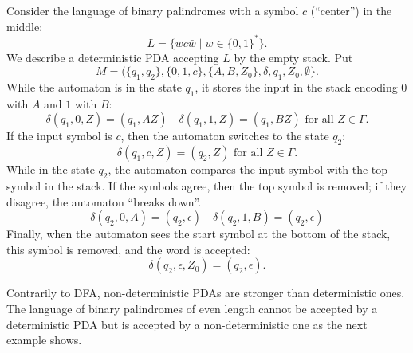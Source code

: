 \begin{page}
\setcounter{section}{6}
\setcounter{subsection}{1}
\setcounter{dfn}{4}
\label{portion:1257}

\begin{exl}
Consider the language of binary palindromes with a symbol $c$ (``center'') in the middle:
\[
L = \{w c \bar{w} \mid w \in \{0,1\}^*\}.
\]
We describe a deterministic PDA accepting $L$ by the empty stack. Put
\[
M = (\{q_1, q_2\}, \{0, 1, c\}, \{A, B, Z_0\}, \delta, q_1, Z_0, \emptyset\}.
\]
While the automaton is in the state $q_1$, it stores the input in the stack encoding $0$ with $A$ and $1$ with $B$:
\[
\delta(q_1, 0, Z) = (q_1, AZ) \quad \delta(q_1, 1, Z) = (q_1, BZ) \text{ for all }Z \in \Gamma.
\]
If the input symbol is $c$, then the automaton switches to the state $q_2$:
\[
\delta(q_1, c, Z) = (q_2, Z) \text{ for all }Z \in \Gamma.
\]
While in the state $q_2$, the automaton compares the input symbol with the top symbol in the stack.
If the symbols agree, then the top symbol is removed; if they disagree, the automaton ``breaks down''.
\[
\delta(q_2, 0, A) = (q_2, \epsilon) \quad \delta(q_2, 1, B) = (q_2, \epsilon)
\]
Finally, when the automaton sees the start symbol at the bottom of the stack, this symbol is removed, and the word is accepted:
\[
\delta(q_2, \epsilon, Z_0) = (q_2, \epsilon).
\]
\end{exl}

\end{page}

\begin{page}
\setcounter{section}{6}
\setcounter{subsection}{1}
\setcounter{dfn}{4}
\label{portion:1258}


Contrarily to DFA, non-deterministic PDAs are stronger than deterministic ones.
The language of binary palindromes of even length cannot be accepted by a deterministic PDA
but is accepted by a non-deterministic one as the next example shows.


\end{page}

